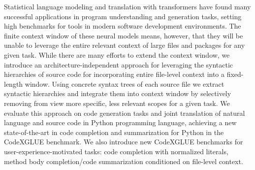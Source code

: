Statistical language modeling and translation with transformers have found many successful applications in program understanding and generation tasks, setting high benchmarks for tools in modern software development environments. The finite context window of these neural models means, however, that they will be unable to leverage the entire relevant context of large files and packages for any given task. While there are many efforts to extend the context window, we introduce an architecture-independent approach for leveraging the syntactic hierarchies of source code for incorporating entire file-level context into a fixed-length window. Using concrete syntax trees of each source file we extract syntactic hierarchies and integrate them into context window by selectively removing from view more specific, less relevant scopes for a given task. We evaluate this approach on code generation tasks and joint translation of natural language and source code in Python programming language, achieving a new state-of-the-art in code completion and summarization for Python in the CodeXGLUE benchmark. We also introduce new CodeXGLUE benchmarks for user-experience-motivated tasks: code completion with normalized literals, method body completion/code summarization conditioned on file-level context.
